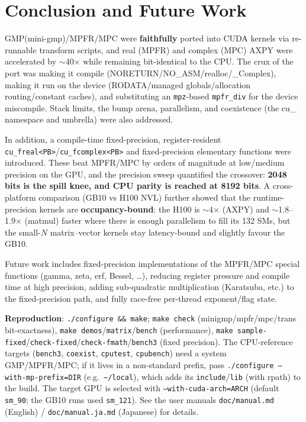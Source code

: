 \documentclass[uplatex,dvipdfmx,a4paper,11pt]{jsarticle}
\newcommand{\code}[1]{\texttt{#1}}
\begin{document}
\section{Conclusion and Future Work}
\label{sec:conclusion}

GMP(mini-gmp)/MPFR/MPC were \textbf{faithfully} ported into CUDA kernels via
re-runnable transform scripts, and real (MPFR) and complex (MPC) AXPY were
accelerated by $\sim$40$\times$ while remaining bit-identical to the CPU. The crux
of the port was making it compile (NORETURN/NO\_ASM/realloc/\_Complex), making it
run on the device (RODATA/managed globals/allocation routing/constant caches),
and substituting an \code{mpz}-based \code{mpfr\_div} for the device miscompile.
Stack limits, the bump arena, parallelism, and coexistence (the cu\_ namespace and
umbrella) were also addressed.

In addition, a compile-time fixed-precision, register-resident
\code{cu\_freal<PB>}/\code{cu\_fcomplex<PB>} and fixed-precision elementary
functions were introduced. These beat MPFR/MPC by orders of magnitude at
low/medium precision on the GPU, and the precision sweep quantified the crossover:
\textbf{2048 bits is the spill knee, and CPU parity is reached at 8192 bits}.
A cross-platform comparison (GB10 vs H100 NVL) further showed that the runtime-precision
kernels are \textbf{occupancy-bound}: the H100 is $\sim$4$\times$ (AXPY) and
$\sim$1.8--1.9$\times$ (matmul) faster where there is enough parallelism to fill its
132 SMs, but the small-$N$ matrix--vector kernels stay latency-bound and slightly
favour the GB10.

Future work includes fixed-precision implementations of the MPFR/MPC special
functions (gamma, zeta, erf, Bessel, \dots), reducing register pressure and
compile time at high precision, adding sub-quadratic multiplication (Karatsuba,
etc.) to the fixed-precision path, and fully race-free per-thread exponent/flag
state.

\bigskip
\noindent\textbf{Reproduction}: \code{./configure \&\& make}; \code{make check}
(minigmp/mpfr/mpc/trans bit-exactness), \code{make demos}/\code{matrix}/\code{bench}
(performance), \code{make sample-fixed}/\code{check-fixed}/\code{check-fmath}/\code{bench3}
(fixed precision). The CPU-reference targets (\code{bench3}, \code{coexist},
\code{cputest}, \code{cpubench}) need a system GMP/MPFR/MPC; if it lives in a
non-standard prefix, pass \code{./configure --with-mp-prefix=DIR} (e.g.\
\code{\textasciitilde/local}), which adds its \code{include}/\code{lib} (with
rpath) to the build. The target GPU is selected with
\code{--with-cuda-arch=ARCH} (default \code{sm\_90}; the GB10 runs used
\code{sm\_121}). See the user manuals \code{doc/manual.md} (English) /
\code{doc/manual.ja.md} (Japanese) for details.
\end{document}
